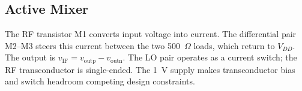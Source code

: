 \subsection{Active Mixer}
The RF transistor M1 converts input voltage into current. The differential
pair M2--M3 steers this current between the two 500~$\Omega$ loads, which
return to $V_{DD}$. The output is $v_{\mathrm{IF}}=v_{\mathrm{outp}}-v_{\mathrm{outn}}$.
The LO pair operates as a current switch; the RF transconductor is
single-ended. The 1~V supply makes transconductor bias and
switch headroom competing design constraints.

%
